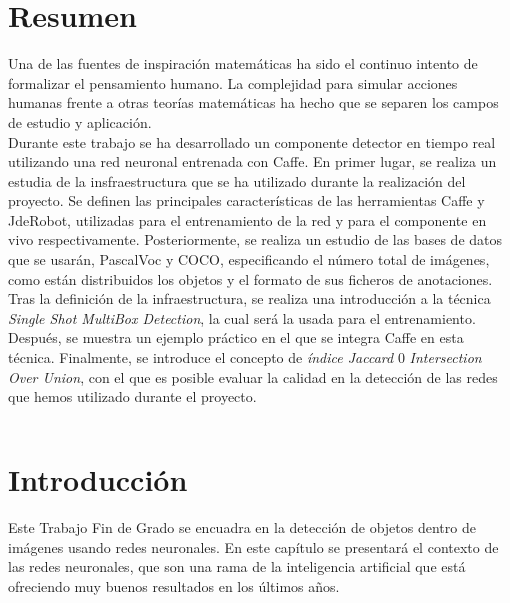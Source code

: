 \documentclass[a4paper, 12pt, spanish, chapterprefix, numbers=noenddot]{book}
\makeatletter
\renewcommand{\acronymname}{Acrónimos}
\renewcommand*{\cleardoublepage}{\clearpage\if@twoside \ifodd\c@page\else
\hbox{}%
\thispagestyle{empty}%
\newpage%
\if@twocolumn\hbox{}\newpage\fi\fi\fi}
\makeatother
\begin{document}
\chapter*{Resumen} %

Una de las fuentes de inspiración matemáticas ha sido el continuo intento de formalizar el pensamiento humano. La complejidad para simular acciones humanas frente a otras teorías matemáticas ha hecho que se separen los campos de estudio y aplicación.\\

Durante este trabajo se ha desarrollado un componente detector en tiempo real utilizando una red neuronal entrenada con Caffe. En primer lugar, se realiza un estudia de la insfraestructura que se ha utilizado durante la realización del proyecto. Se definen las principales características de las herramientas Caffe y JdeRobot, utilizadas para el entrenamiento de la red y para el componente en vivo respectivamente. Posteriormente, se realiza un estudio de las bases de datos que se usarán, PascalVoc y COCO, especificando el número total de imágenes, como están distribuidos los objetos y el formato de sus ficheros de anotaciones. Tras la definición de la infraestructura, se realiza una introducción a la técnica \textit{Single Shot MultiBox Detection}, la cual será la usada para el entrenamiento. Después, se muestra un ejemplo práctico en el que se integra Caffe en esta técnica. Finalmente, se introduce el concepto de \textit{índice Jaccard} 0 \textit{Intersection Over Union}, con el que es posible evaluar la calidad en la detección de las redes que hemos utilizado durante el proyecto.

\newpage
$\ $
\thispagestyle{empty} 

\tableofcontents
\thispagestyle{empty}
\cleardoublepage

\cleardoublepage %
\listoffigures


\renewcommand{\acronymname}{Acrónimos}
\cleardoublepage
{}
\printglossary[type=\acronymtype]

\cleardoublepage

 
\chapter{Introducción}

Este Trabajo Fin de Grado se encuadra en la detección de objetos dentro de imágenes usando redes neuronales. En este capítulo se presentará el contexto de las redes neuronales, que son una rama de la inteligencia artificial que está ofreciendo muy buenos resultados en los últimos años.\\
\end{document}
